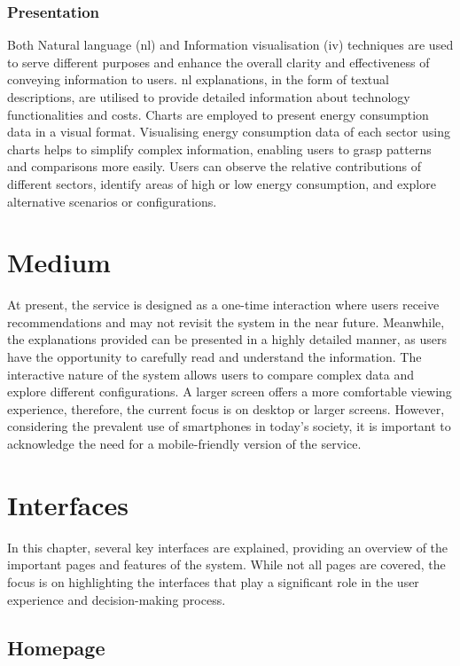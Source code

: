 \subsubsection{Presentation}

Both Natural language (\gls{nl}) and Information visualisation (\gls{iv}) techniques are used to serve different purposes and enhance the overall clarity and effectiveness of conveying information to users. 
\gls{nl} explanations, in the form of textual descriptions, are utilised to provide detailed information about technology functionalities and costs. 
Charts are employed to present energy consumption data in a visual format. 
Visualising energy consumption data of each sector using charts helps to simplify complex information, enabling users to grasp patterns and comparisons more easily. 
Users can observe the relative contributions of different sectors, identify areas of high or low energy consumption, and explore alternative scenarios or configurations. 


\section{Medium}

At present, the service is designed as a one-time interaction where users receive recommendations and may not revisit the system in the near future. 
Meanwhile, the explanations provided can be presented in a highly detailed manner, as users have the opportunity to carefully read and understand the information. 
The interactive nature of the system allows users to compare complex data and explore different configurations. 
A larger screen offers a more comfortable viewing experience, therefore, the current focus is on desktop or larger screens.
However, considering the prevalent use of smartphones in today's society, it is important to acknowledge the need for a mobile-friendly version of the service. 


\section{Interfaces}

In this chapter, several key interfaces are explained, providing an overview of the important pages and features of the system. 
While not all pages are covered, the focus is on highlighting the interfaces that play a significant role in the user experience and decision-making process. 


\subsection*{Homepage}

